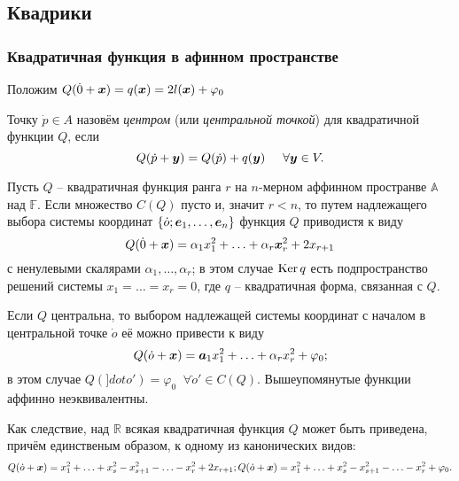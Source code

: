 \subsection*{Квадрики}

\subsubsection{Квадратичная функция в афинном пространстве}

\begin{to_def} 
    Положим $Q(\dot 0 + \mbox{\boldmath $x$}) = q(\mbox{\boldmath $x$}) = 2l(\mbox{\boldmath $x$}) + \varphi_0$ 
\end{to_def}

\begin{to_def} 
    Точку $\dot p \in A$ назовём \textit{центром} (или \textit{центральной точкой})  для квадратичной функции $Q$, если
    $$
        Q(\dot p + \mbox{\boldmath $y$}) = Q(\dot p) + q(\mbox{\boldmath $y$}) \hspace{0.5cm}  \forall \mbox{\boldmath $y$} \in V.
    $$
\end{to_def}

\begin{to_thr} 
    Пусть $Q$ -- квадратичная функция ранга $r$ на $n$-мерном аффинном пространве $\mathbb{A}$ над $\mathbb{F}$. Если множество $C(Q)$ пусто и, значит $r < n$, то путем надлежащего выбора системы координат $\{\dot o; \mbox{\boldmath $e$}_{1}, \ldots,  \mbox{\boldmath $e$}_n\}$ функция $Q$ приводистя к виду
    $$
        Q(\dot 0 + \mbox{\boldmath $x$}) = \alpha_{1} x_{1}^2 + \ldots  + \alpha_r \mbox{\boldmath $x$}_r^2 + 2x_{r+1}
    $$
    с ненулевыми скалярами $\alpha_1, \ldots, \alpha_r$; в этом случае $\mathop{\mathrm{Ker}}\nolimits q$ есть подпространство решений системы $x_{1} = \ldots = x_r = 0$, где $q$ -- квадратичная форма, связанная с $Q$. 

    Если $Q$ центральна, то выбором надлежащей системы координат с началом в центральной точке $\dot o$ её можно привести к виду
    $$
        Q(\dot o + \mbox{\boldmath $x$}) = \mbox{\boldmath $a$}_{1} x_1^2 + \ldots  + \alpha_r x^2_r + \varphi_0;
    $$
    в этом случае $Q(]dot o') = \varphi_0 \; \; \forall \dot o' \in C(Q)$. Вышеупомянутые функции аффинно неэквивалентны.
    \end{to_thr}


Как следствие, над $\mathbb{R}$ всякая квадратичная функция $Q$ может быть приведена, причём единственым образом, к одному из канонических видов:
\begin{align}
    Q(\dot o + \mbox{\boldmath $x$}) = x_1^2 + \ldots + x_s^2 - x_{s+1}^2 - \ldots  - x_r^2 + 2x_{r+1};
    Q(\dot o + \mbox{\boldmath $x$}) = x_1^2 + \ldots + x_s^2 - x_{s+1}^2 - \ldots  - x_r^2 + \varphi_0.
\end{align}

